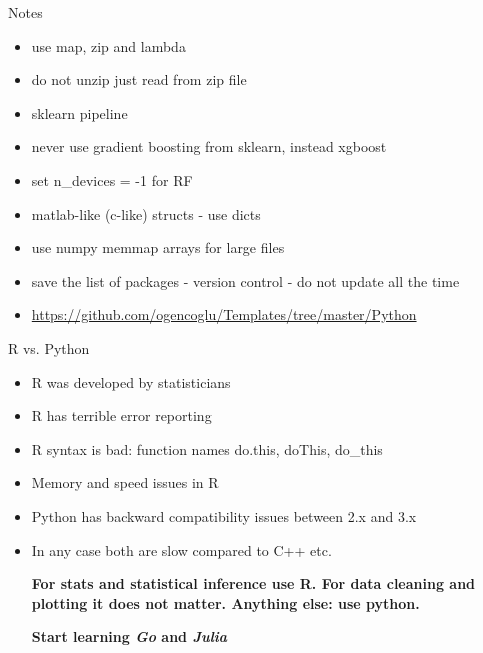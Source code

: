 \documentclass{beamer}
\begin{document}
\begin{frame}{Notes}

	\begin{itemize}
		\item {use map, zip and lambda} \pause
		\item {do not unzip just read from zip file}\pause
		\item {sklearn pipeline}\pause
		\item {never use gradient boosting from sklearn, instead xgboost}\pause
		\item {set n\_devices = -1 for RF}\pause
		\item {matlab-like (c-like) structs - use dicts}\pause
		\item {use numpy memmap arrays for large files}\pause
		\item {save the list of packages - version control - do not update all the time}\pause
		\item {\url{https://github.com/ogencoglu/Templates/tree/master/Python}}
	\end{itemize}
	
\end{frame}

\begin{frame}{R vs. Python}
	\begin{itemize}

	\item {R was developed by statisticians}\pause
	\item {R has terrible error reporting}\pause
	\item {R syntax is bad: function names do.this, doThis, do\_this}\pause
	\item {Memory and speed issues in R}\pause
	\vspace{0.3cm}
	
	\item {Python has backward compatibility issues between 2.x and 3.x}\pause
	\item {In any case both are slow compared to C++ etc.}\pause
	
	\vspace{0.3cm}
	\textbf{For stats and statistical inference use R. For data cleaning and plotting it does not matter. Anything else: use python. \\} \pause
	\centerline{\textbf{Start learning \textit{Go} and \textit{Julia}}}
	\end{itemize}
\end{frame}
\end{document}
